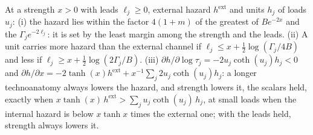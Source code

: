 \begin{proposition}\label{imp:carry}
At a strength $x>0$ with leads $\ell_j\ge0$, external hazard
$h^{\mathrm{ext}}$ and units $h_j$ of loads $u_j$: (i) the hazard lies
within the factor $4(1+m)$ of the greatest of $Be^{-2x}$ and the
$\Gamma_je^{-2\ell_j}$: it is set by the least margin among the strength
and the leads. (ii) A unit carries more hazard than the external channel
if $\ell_j\le x+\tfrac12\log(\Gamma_j/4B)$ and less if
$\ell_j\ge x+\tfrac12\log(2\Gamma_j/B)$. (iii)
$\partial h/\partial\log\tau_j=-2u_j\coth(u_j)h_j<0$ and
$\partial h/\partial x=-2\tanh(x)h^{\mathrm{ext}}+x^{-1}\sum_j2u_j\coth(u_j)h_j$:
a longer technoanatomy always lowers the hazard, and strength lowers it,
the scalars held, exactly when
$x\tanh(x)\,h^{\mathrm{ext}}>\sum_ju_j\coth(u_j)\,h_j$, at small loads when
the internal hazard is below $x\tanh x$ times the external one; with the
leads held, strength always lowers it.
\end{proposition}


